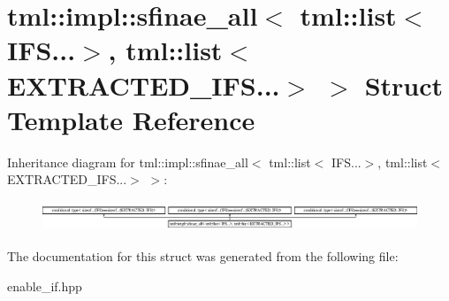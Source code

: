 \hypertarget{structtml_1_1impl_1_1sfinae__all_3_01tml_1_1list_3_01IFS_8_8_8_4_00_01tml_1_1list_3_01EXTRACTED__IFS_8_8_8_4_01_4}{\section{tml\+:\+:impl\+:\+:sfinae\+\_\+all$<$ tml\+:\+:list$<$ I\+F\+S...$>$, tml\+:\+:list$<$ E\+X\+T\+R\+A\+C\+T\+E\+D\+\_\+\+I\+F\+S...$>$ $>$ Struct Template Reference}
\label{structtml_1_1impl_1_1sfinae__all_3_01tml_1_1list_3_01IFS_8_8_8_4_00_01tml_1_1list_3_01EXTRACTED__IFS_8_8_8_4_01_4}
}
Inheritance diagram for tml\+:\+:impl\+:\+:sfinae\+\_\+all$<$ tml\+:\+:list$<$ I\+F\+S...$>$, tml\+:\+:list$<$ E\+X\+T\+R\+A\+C\+T\+E\+D\+\_\+\+I\+F\+S...$>$ $>$\+:\begin{figure}[H]
\begin{center}
\leavevmode
\includegraphics[height=0.912795cm]{structtml_1_1impl_1_1sfinae__all_3_01tml_1_1list_3_01IFS_8_8_8_4_00_01tml_1_1list_3_01EXTRACTED__IFS_8_8_8_4_01_4}
\end{center}
\end{figure}


The documentation for this struct was generated from the following file\+:\begin{DoxyCompactItemize}
\item 
enable\+\_\+if.\+hpp\end{DoxyCompactItemize}
